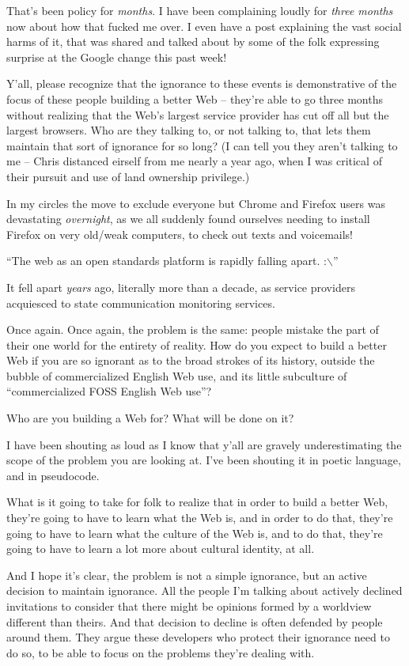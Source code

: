 \documentclass[11pt]{article}
\begin{document}
\begin{itemize}
That’s been policy for \emph{months}. I have been complaining loudly for \emph{three months} now about how that fucked me over. I even have a post explaining the vast social harms of it, that was shared and talked about by some of the folk expressing surprise at the Google change this past week!

Y’all, please recognize that the ignorance to these events is demonstrative of the focus of these people building a better Web – they’re able to go three months without realizing that the Web’s largest service provider has cut off all but the largest browsers. Who are they talking to, or not talking to, that lets them maintain that sort of ignorance for so long? (I can tell you they aren’t talking to me – Chris distanced eirself from me nearly a year ago, when I was critical of their pursuit and use of land ownership privilege.)

In my circles the move to exclude everyone but Chrome and Firefox users was devastating \emph{overnight}, as we all suddenly found ourselves needing to install Firefox on very old/weak computers, to check out texts and voicemails!

“The web as an open standards platform is rapidly falling apart. :$\backslash$”

It fell apart \emph{years} ago, literally more than a decade, as service providers acquiesced to state communication monitoring services.

Once again. Once again, the problem is the same: people mistake the part of their one world for the entirety of reality. How do you expect to build a better Web if you are so ignorant as to the broad strokes of its history, outside the bubble of commercialized English Web use, and its little subculture of “commercialized FOSS English Web use”?

Who are you building a Web for? What will be done on it?

I have been shouting as loud as I know that y’all are gravely underestimating the scope of the problem you are looking at. I’ve been shouting it in poetic language, and in pseudocode.

What is it going to take for folk to realize that in order to build a better Web, they’re going to have to learn what the Web is, and in order to do that, they’re going to have to learn what the culture of the Web is, and to do that, they’re going to have to learn a lot more about cultural identity, at all.

And I hope it’s clear, the problem is not a simple ignorance, but an active decision to maintain ignorance. All the people I’m talking about actively declined invitations to consider that there might be opinions formed by a worldview different than theirs. And that decision to decline is often defended by people around them. They argue these developers who protect their ignorance need to do so, to be able to focus on the problems they’re dealing with.


\end{itemize}
\end{document}
